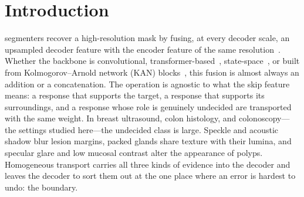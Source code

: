 \section{Introduction}
\label{sec:introduction}

 segmenters recover a high-resolution mask by fusing, at every decoder scale, an upsampled decoder feature with the encoder feature of the same resolution~\cite{ronneberger2015unet,zhou2020unetpp}. Whether the backbone is convolutional, transformer-based~\cite{chen2021transunet,cao2023swinunet}, state-space~\cite{ruan2024umamba}, or built from Kolmogorov--Arnold network (KAN) blocks~\cite{li2025ukan}, this fusion is almost always an addition or a concatenation. The operation is agnostic to what the skip feature means: a response that supports the target, a response that supports its surroundings, and a response whose role is genuinely undecided are transported with the same weight. In breast ultrasound, colon histology, and colonoscopy---the settings studied here---the undecided class is large. Speckle and acoustic shadow blur lesion margins, packed glands share texture with their lumina, and specular glare and low mucosal contrast alter the appearance of polyps. Homogeneous transport carries all three kinds of evidence into the decoder and leaves the decoder to sort them out at the one place where an error is hardest to undo: the boundary.

